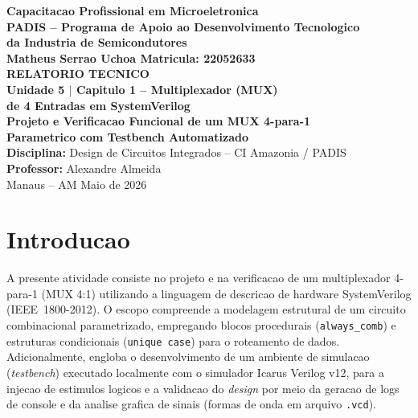 \documentclass[12pt, a4paper]{article}
\begin{document}
\begin{titlepage}
\begin{center}
  {\Large\bfseries Capacitacao Profissional em Microeletronica}\\[0.15cm]
  {\large\bfseries PADIS -- Programa de Apoio ao Desenvolvimento Tecnologico\\
   da Industria de Semicondutores}\\[1.6cm]

  {\large\bfseries Matheus Serrao Uchoa \quad Matricula: 22052633}\\[1.8cm]

  {\LARGE\bfseries RELATORIO TECNICO\\[0.3cm]
   Unidade 5 $|$ Capitulo 1 -- Multiplexador (MUX)\\
   de 4 Entradas em SystemVerilog}\\[1.0cm]

  {\Large\bfseries Projeto e Verificacao Funcional de um MUX 4-para-1\\
   Parametrico com Testbench Automatizado}\\[1.6cm]

  \vfill
  {\normalsize\textbf{Disciplina:} Design de Circuitos Integrados -- CI Amazonia / PADIS}\\[0.1cm]
  {\normalsize\textbf{Professor:} Alexandre Almeida}\\[0.3cm]
  {\normalsize Manaus -- AM \quad Maio de 2026}
\end{center}
\end{titlepage}

\setcounter{page}{1}
\tableofcontents
\newpage

\section{Introducao}

A presente atividade consiste no projeto e na verificacao de um multiplexador 4-para-1
(MUX 4:1) utilizando a linguagem de descricao de hardware SystemVerilog (IEEE~1800-2012).
O escopo compreende a modelagem estrutural de um circuito combinacional parametrizado,
empregando blocos procedurais (\texttt{always\_comb}) e estruturas condicionais
(\texttt{unique case}) para o roteamento de dados. Adicionalmente, engloba o
desenvolvimento de um ambiente de simulacao (\textit{testbench}) executado localmente
com o simulador Icarus Verilog v12, para a injecao de estimulos logicos e a validacao
do \textit{design} por meio da geracao de logs de console e da analise grafica de
sinais (formas de onda em arquivo \texttt{.vcd}).
\end{document}
